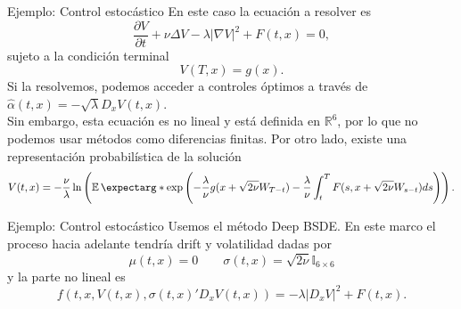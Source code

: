 \documentclass[aspectratio=169,xcolor=dvipsnames]{beamer}
\newcommand{\bbR}{\mathbb{R}}
\newcommand{\dpartial}[2]{\frac{\partial #1}{\partial #2}}
\begin{document}
\begin{frame}{Ejemplo: Control estocástico}
	En este caso la ecuación a resolver es 
	\begin{equation}
		\label{eqn:HJB_example}
		\dpartial{V}{t}+\nu \Delta V -\lambda |\nabla V|^2+F(t,x)=0,
	\end{equation}
sujeto a la condición terminal
\begin{equation}
	V(T,x)=g(x).
\end{equation}
Si la resolvemos, podemos acceder a controles óptimos a través de $\hat{\alpha}(t,x)=-\sqrt{\lambda}D_x V(t,x)$. \\

\vspace*{5mm}
Sin embargo, esta ecuación es no lineal y está definida en $\bbR^6$, por lo que no podemos usar métodos como diferencias finitas. Por otro lado, existe una representación probabilística de la solución
\begin{equation}
	\label{eqn:probabilisticExact}
	V(t,x)=-\frac{\nu}{\lambda}\ln\left(\expect*{\exp \left(-\frac{\lambda}{\nu} g(x+\sqrt{2\nu}W_{T-t})-\frac{\lambda}{\nu}\int_{t}^{T}F(s,x+\sqrt{2\nu}W_{s-t})ds\right)}\right).
\end{equation}
\end{frame}

\begin{frame}{Ejemplo: Control estocástico}
	Usemos el método Deep BSDE. En este marco el proceso hacia adelante tendría drift y volatilidad dadas por
\begin{equation}
	\mu(t,x)=0\quad \quad \sigma(t,x)=\sqrt{2\nu} \mathbb{I}_{6\times 6}
\end{equation}
y la parte no lineal es 
\begin{equation}
	f(t,x,V(t,x),\sigma(t,x)'D_x V(t,x))=-\lambda |D_x V|^2+F(t,x).
\end{equation}
\end{frame}
\end{document}

